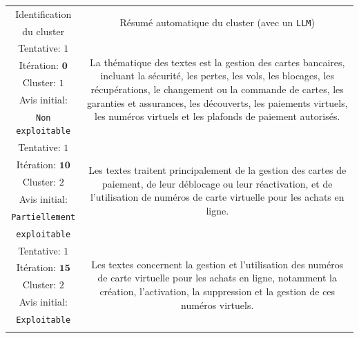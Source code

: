 			\begin{table}[!htb]
				\begin{center}
				\def\arraystretch{0.8}  %
				\begin{tabular}{|c|c|}
				
				\hline
				Identification
					& \multirow{2}{*}{
						Résumé automatique du cluster (avec un \texttt{LLM})
					}
					\tabularnewline
				du cluster
					&
					\tabularnewline
					\hline

				{ \footnotesize Tentative: $1$ }
					& \multirow{5}{*}{\parbox{12cm}{
						\footnotesize La thématique des textes est la gestion des cartes bancaires, incluant la sécurité, les pertes, les vols, les blocages, les récupérations, le changement ou la commande de cartes, les garanties et assurances, les découverts, les paiements virtuels, les numéros virtuels et les plafonds de paiement autorisés.
					}}
					\tabularnewline
				{ \footnotesize Itération: $\textbf{0}$ }
					&
					\tabularnewline
				{ \footnotesize Cluster: $1$ }
					&
					\tabularnewline
				{ \footnotesize Avis initial: }
					&
					\tabularnewline
				{ \footnotesize \color{colorDarkPastelRed} \texttt{Non exploitable} }
					&
					\tabularnewline
					\hline
					
				{ \footnotesize Tentative: $1$ }
					& \multirow{6}{*}{\parbox{12cm}{
						\footnotesize Les textes traitent principalement de la gestion des cartes de paiement, de leur déblocage ou leur réactivation, et de l'utilisation de numéros de carte virtuelle pour les achats en ligne.
					}}
					\tabularnewline
				{ \footnotesize Itération: $\textbf{10}$ }
					&
					\tabularnewline
				{ \footnotesize Cluster: $2$ }
					&
					\tabularnewline
				{ \footnotesize Avis initial: }
					&
					\tabularnewline
				{ \footnotesize \color{colorCarrotOrange} \texttt{Partiellement} }
					&
					\tabularnewline
				{ \footnotesize \color{colorCarrotOrange} \texttt{exploitable} }
					&
					\tabularnewline
					\hline
					
				{ \footnotesize Tentative: $1$ }
					& \multirow{5}{*}{\parbox{12cm}{
						\footnotesize Les textes concernent la gestion et l'utilisation des numéros de carte virtuelle pour les achats en ligne, notamment la création, l'activation, la suppression et la gestion de ces numéros virtuels.
					}}
					\tabularnewline
				{ \footnotesize Itération: $\textbf{15}$ }
					&
					\tabularnewline
				{ \footnotesize Cluster: $2$ }
					&
					\tabularnewline
				{ \footnotesize Avis initial: }
					&
					\tabularnewline
				{ \footnotesize \color{colorDarkPastelGreen} \texttt{Exploitable} }
					&
					\tabularnewline
					\hdashline
					

\end{tabular}
\end{center}
\end{table}
